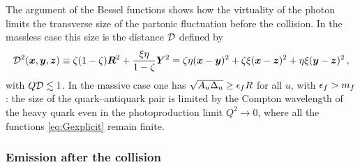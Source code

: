 The argument of the Bessel functions shows how the virtuality of the photon limits the transverse size
of the partonic fluctuation before the collision. In the massless case this size is the distance $\mathcal{D}$
defined by
\begin{equation}
\mathcal{D}^2(\bm{x},\bm{y},\bm{z})\equiv\zeta(1-\zeta)\bm{R}^2+\frac{\xi\eta}{1-\zeta}\bm{Y}^2
=\zeta\eta(\bm{x}-\bm{y})^2+\zeta\xi(\bm{x}-\bm{z})^2+\eta\xi(\bm{y}-\bm{z})^2\,,
\label{eq:D}
\end{equation}
with $Q\mathcal{D}\lesssim1$. In the massive case one has $\sqrt{A_u\Delta_u}\geq\epsilon_f R$ for all $u$, with
$\epsilon_f>m_f$: the size of the quark--antiquark pair is limited by the Compton wavelength of the heavy
quark even in the photoproduction limit $Q^2\to0$, where all the functions \eqref{eq:Gexplicit} remain
finite.

\subsubsection{Emission after the collision}
\label{sec:after}

